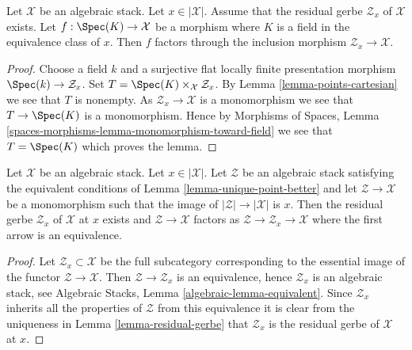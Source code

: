 \begin{lemma}
\label{lemma-residual-gerbe-points}
Let $\mathcal{X}$ be an algebraic stack. Let $x \in |\mathcal{X}|$.
Assume that the residual gerbe $\mathcal{Z}_x$ of $\mathcal{X}$ exists.
Let $f : \Spec(K) \to \mathcal{X}$ be a morphism where $K$ is a field
in the equivalence class of $x$. Then $f$ factors through the inclusion
morphism $\mathcal{Z}_x \to \mathcal{X}$.
\end{lemma}

\begin{proof}
Choose a field $k$ and a surjective flat locally finite presentation
morphism $\Spec(k) \to \mathcal{Z}_x$. Set
$T = \Spec(K) \times_\mathcal{X} \mathcal{Z}_x$. By
Lemma \ref{lemma-points-cartesian}
we see that $T$ is nonempty. As $\mathcal{Z}_x \to \mathcal{X}$
is a monomorphism we see that $T \to \Spec(K)$ is a monomorphism.
Hence by
Morphisms of Spaces, Lemma
\ref{spaces-morphisms-lemma-monomorphism-toward-field}
we see that $T = \Spec(K)$ which proves the lemma.
\end{proof}

\begin{lemma}
\label{lemma-residual-gerbe-unique}
Let $\mathcal{X}$ be an algebraic stack. Let $x \in |\mathcal{X}|$.
Let $\mathcal{Z}$ be an algebraic stack satisfying the equivalent conditions of
Lemma \ref{lemma-unique-point-better}
and let $\mathcal{Z} \to \mathcal{X}$ be a monomorphism such that the image
of $|\mathcal{Z}| \to |\mathcal{X}|$ is $x$. Then the residual gerbe
$\mathcal{Z}_x$ of $\mathcal{X}$ at $x$ exists and
$\mathcal{Z} \to \mathcal{X}$ factors as
$\mathcal{Z} \to \mathcal{Z}_x \to \mathcal{X}$ where the first arrow
is an equivalence.
\end{lemma}

\begin{proof}
Let $\mathcal{Z}_x \subset \mathcal{X}$ be the full subcategory corresponding
to the essential image of the functor $\mathcal{Z} \to \mathcal{X}$.
Then $\mathcal{Z} \to \mathcal{Z}_x$ is an equivalence, hence
$\mathcal{Z}_x$ is an algebraic stack, see
Algebraic Stacks, Lemma \ref{algebraic-lemma-equivalent}.
Since $\mathcal{Z}_x$ inherits all the properties of $\mathcal{Z}$ from
this equivalence it is clear from the uniqueness in
Lemma \ref{lemma-residual-gerbe}
that $\mathcal{Z}_x$ is the residual gerbe of $\mathcal{X}$ at $x$.
\end{proof}










